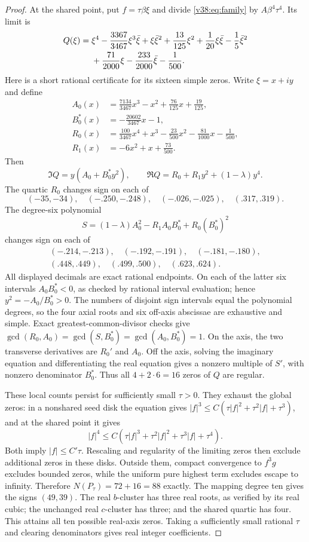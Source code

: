 \documentclass[UTF8,11pt]{ctexart}
\theoremstyle{definition}
\numberwithin{equation}{section}
\begin{document}
\begin{proof}
At the shared point, put $f=\tau\beta\xi$ and divide
\eqref{v38:eq:family} by $A\beta^4\tau^4$. Its limit is
\begin{align}
 Q(\xi)={}&\xi^4-\frac{3367}{3467}\xi^3\bar\xi
       +\xi\bar\xi^2+\frac{13}{125}\xi^2
       +\frac1{20}\xi\bar\xi-\frac15\bar\xi^2\notag\\
       &+\frac{71}{2000}\xi-\frac{233}{2000}\bar\xi
        -\frac1{500}.                              \label{v38:eq:quartic}
\end{align}
Here is a short rational certificate for its sixteen simple
zeros. Write $\xi=x+iy$ and define
\begin{align*}
 A_0(x)&=\frac{7134}{3467}x^3-x^2+\frac{76}{125}x+\frac{19}{125},\\
 B_0^*(x)&=-\frac{20602}{3467}x-1,\\
 R_0(x)&=\frac{100}{3467}x^4+x^3-\frac{23}{500}x^2
                         -\frac{81}{1000}x-\frac1{500},\\
 R_1(x)&=-6x^2+x+\frac{73}{500}.
\end{align*}
Then
\[
 \Im Q=y(A_0+B_0^*y^2),\qquad
 \Re Q=R_0+R_1y^2+(1-\lambda)y^4.
\]
The quartic $R_0$ changes sign on each of
\[
 (-35,-34),\quad(-.250,-.248),\quad
 (-.026,-.025),\quad(.317,.319).
\]
The degree-six polynomial
\[
 S=(1-\lambda)A_0^2-R_1A_0B_0^*+R_0(B_0^*)^2
\]
changes sign on each of
\begin{gather*}
 (-.214,-.213),\quad(-.192,-.191),\quad(-.181,-.180),\\
 (.448,.449),\quad(.499,.500),\quad(.623,.624).
\end{gather*}
All displayed decimals are exact rational endpoints.
On each of the latter six intervals $A_0B_0^*<0$, as checked
by rational interval evaluation; hence $y^2=-A_0/B_0^*>0$.
The numbers of disjoint sign intervals equal the polynomial
degrees, so the four axial roots and six off-axis abscissae
are exhaustive and simple. Exact greatest-common-divisor
checks give $\gcd(R_0,A_0)=\gcd(S,B_0^*)=
\gcd(A_0,B_0^*)=1$. On the axis, the two transverse derivatives
are $R_0'$ and $A_0$. Off the axis, solving the imaginary
equation and differentiating the real equation gives a nonzero
multiple of $S'$, with nonzero denominator $B_0^*$.
Thus all $4+2\cdot6=16$ zeros of $Q$ are regular.

These local counts persist for sufficiently small $\tau>0$.
They exhaust the global zeros: in a nonshared seed disk the
equation gives $|f|^3\le C(\tau|f|^2+\tau^2|f|+\tau^3)$,
and at the shared point it gives
\[
 |f|^4\le C(\tau|f|^3+\tau^2|f|^2+
                    \tau^3|f|+\tau^4).
\]
Both imply $|f|\le C'\tau$. Rescaling and regularity of the
limiting zeros then exclude additional zeros in these disks.
Outside them, compact convergence to $f^3g$ excludes bounded
zeros, while the uniform pure highest term excludes escape
to infinity. Therefore $N(P_\tau)=72+16=88$ exactly.
The mapping degree ten gives the signs $(49,39)$.
The real $b$-cluster has three real roots, as verified by its
real cubic; the unchanged real $c$-cluster has three; and the
shared quartic has four. This attains all ten possible real-axis
zeros. Taking a sufficiently small rational $\tau$ and clearing
denominators gives real integer coefficients.


\end{proof}
\end{document}
